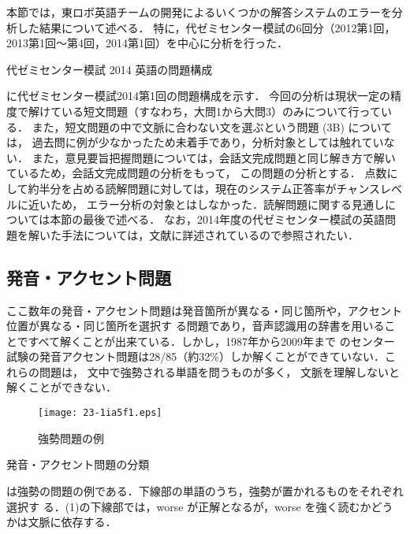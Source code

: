 \documentclass[japanese]{jnlp_1.4b}
\def\FIGREF#1{}
\def\TABREF#1{}
\begin{document}
本節では，東ロボ英語チームの開発によるいくつかの解答システムのエラーを分析した結果について述べる．
特に，代ゼミセンター模試の6回分（2012第1回，2013第1回〜第4回，2014第1回）を中心に分析を行った．

\begin{table}[b]
\caption{代ゼミセンター模試 2014 英語の問題構成}
\label{tab:eigo:mondai}

\end{table}

\TABREF{tab:eigo:mondai}に代ゼミセンター模試2014第1回の問題構成を示す．
今回の分析は現状一定の精度で解けている短文問題（すなわち，大問1から大問3）のみについて行っている．
また，短文問題の中で文脈に合わない文を選ぶという問題 (3B) については，
過去問に例が少なかったため未着手であり，分析対象としては触れていない．
また，意見要旨把握問題については，会話文完成問題と同じ解き方で解いているため，会話文完成問題の分析をもって，
この問題の分析とする．
点数にして約半分を占める読解問題に対しては，現在のシステム正答率がチャンスレベルに近いため，
エラー分析の対象とはしなかった．読解問題に関する見通しについては本節の最後で述べる．
なお，2014年度の代ゼミセンター模試の英語問題を解いた手法については，文献\cite{eigo}に詳述されているので参照されたい．


\subsection{発音・アクセント問題}
\label{sec:eigo:1ab}

ここ数年の発音・アクセント問題は発音箇所が異なる・同じ箇所や，アクセント位置が異なる・同じ箇所を選択す
る問題であり，音声認識用の辞書を用いることですべて解くことが出来ている．しかし，1987年から2009年まで
のセンター試験の発音アクセント問題は28/85（約32\%）しか解くことができていない．これらの問題は，
文中で強勢される単語を問うものが多く，
文脈を理解しないと解くことができない．

\begin{figure}[b]
\begin{center}
\texttt{[image: 23-1ia5f1.eps]}
\end{center}
\caption{強勢問題の例}
\label{fig:eigo:1ab} 
\end{figure}
\begin{table}[b]
\caption{発音・アクセント問題の分類}
\label{tab:eigo:1ab} 

\end{table}

\FIGREF{fig:eigo:1ab}は強勢の問題の例である．下線部の単語のうち，強勢が置かれるものをそれぞれ選択す
る．(1)の下線部では，worse が正解となるが，worse を強く読むかどうかは文脈に依存する．
\end{document}
